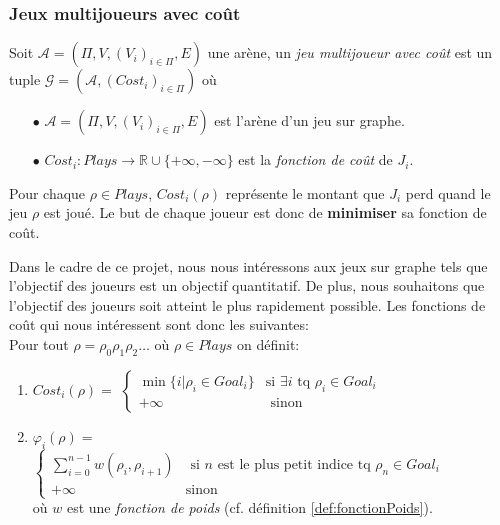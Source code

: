 

\subsubsection{Jeux multijoueurs avec coût}

\begin{defi}
	Soit $\mathcal{A} = (\Pi, V, (V_{i})_{i \in \Pi},E)$ une arène,
	un \textit{jeu multijoueur avec coût} est un tuple $\mathcal{G} = (\mathcal{A},(Cost_{i})_{i \in \Pi})$ où
	\begin{enumerate}
		\item[$\bullet$] $\mathcal{A} = (\Pi ,V ,(V_{i})_{i \in \Pi} ,E )$ est l'arène d'un jeu sur graphe.
		\item[$\bullet$] $Cost_{i}: Plays \rightarrow \mathbb{R} \cup \{ +\infty , -\infty \} $ est la \textit{fonction de coût} de $J_{i}$. 
	\end{enumerate}
\end{defi}


	Pour chaque $\rho \in Plays$, $Cost_{i}(\rho)$ représente le montant que $J_{i}$ perd quand le jeu $\rho$ est joué.
	Le but de chaque joueur est donc de \textbf{minimiser} sa fonction de coût.

\begin{exemple}
	\label{ex:fonctionsCout}
  Dans le cadre de ce projet, nous nous intéressons aux jeux sur graphe tels que l'objectif des joueurs est un objectif quantitatif. De plus, nous souhaitons que l'objectif des joueurs soit atteint le plus rapidement possible. Les fonctions de coût qui nous intéressent sont donc les suivantes: \\
	
	Pour tout  $\rho = \rho _{0} \rho _{1} \rho _{2} \ldots $ où $\rho \in Plays$ on définit:
	\begin{enumerate}
	\item $Cost_{i}(\rho) = $ $\begin{cases} 
									\min \{ i | \rho _{i} \in Goal_{i} \} & \text{si } \exists i \text{ tq } \rho _{i} \in Goal_{i} \\
									+\infty & \text{ sinon}
									\end{cases}$
	\item $\varphi _{i}(\rho) = $ $\begin{cases}
									\sum_{i = 0}^{n-1} w(\rho_{i},\rho_{i+1}) & \text{ si } n \text{ est le plus petit indice tq } \rho_{n}\in 					  Goal_{i}\\
									+\infty & \text{sinon}
									\end{cases}$ \\
									où $w$ est une \textit{fonction de poids} (cf. définition \ref{def:fonctionPoids}).
	\end{enumerate}
\end{exemple}

